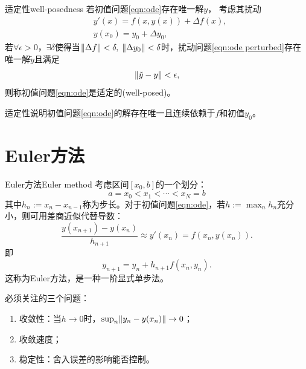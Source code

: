 \begin{definition}
    {适定性}{well-posedness}
    若初值问题\eqref{eqn:ode}存在唯一解$y$，
    考虑其扰动
    \begin{subequations}
        \label{eqn:ode perturbed}
        \begin{align}
            &y'(x) = f(x,y(x)) + \Delta f(x),\\
            &y(x_0) = y_0 + \Delta y_0,
        \end{align}
    \end{subequations}
    若$\forall\epsilon > 0$，$\exists\delta$使得当$\lVert\Delta f\rVert < \delta,\;\lVert\Delta y_0\rVert < \delta$时，扰动问题\eqref{eqn:ode perturbed}存在唯一解$\tilde y$且满足
    \begin{equation}
        \lVert\tilde y - y\rVert < \epsilon,
    \end{equation}
    则称初值问题\eqref{eqn:ode}是适定的(well-posed)。
\end{definition}

\begin{remark}
    适定性说明初值问题\eqref{eqn:ode}的解存在唯一且连续依赖于$f$和初值$y_0$。
\end{remark}

\section{Euler方法}

\begin{theorem}
    {Euler方法}{Euler method}
    考虑区间$[x_0,b]$的一个划分：
    \[
        a = x_0 < x_1 < \cdots < x_N = b
    \]
    其中$h_n := x_n - x_{n-1}$称为步长。对于初值问题\eqref{eqn:ode}，若$\textstyle h := \max_n h_n$充分小，则可用差商近似代替导数：
    \[
        \frac{y(x_{n+1}) - y(x_n)}{h_{n+1}} \approx y'(x_n) = f(x_n,y(x_n)).
    \]
    即
    \begin{equation}
        \label{eqn:Euler}
        y_{n+1} = y_n + h_{n+1}f(x_n,y_n).
    \end{equation}
    这称为Euler方法，是一种一阶显式单步法。
\end{theorem}

\begin{remark}
    必须关注的三个问题：
    \begin{enumerate}
        \item 收敛性：当$h \to 0$时，$\textstyle \sup_n\lVert y_n - y(x_n)\rVert \to 0$；
        \item 收敛速度；
        \item 稳定性：舍入误差的影响能否控制。
    \end{enumerate}
\end{remark}

